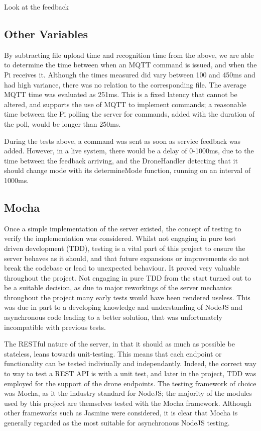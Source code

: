 \documentclass{article}
\begin{document}
Look at the feedback

\subsection{Other Variables}
By subtracting file upload time and recognition time from the above, we are able to determine the time between when an MQTT command is issued, and when the Pi receives it. Although the times measured did vary between 100 and 450ms and had high variance, there was no relation to the corresponding file. The average MQTT time was evaluated as 251ms. This is a fixed latency that cannot be altered, and supports the use of MQTT to implement commands; a reasonable time between the Pi polling the server for commands, added with the duration of the poll, would be longer than 250ms. 

During the tests above, a command was sent as soon as service feedback was added. However, in a live system, there would be a delay of 0-1000ms, due to the time between the feedback arriving, and the DroneHandler detecting that it should change mode with its determineMode function, running on an interval of 1000ms. 







\subsection{Mocha}
Once a simple implementation of the server existed, the concept of testing to verify the implementation was considered. Whilst not engaging in pure test driven development (TDD), testing is a vital part of this project to ensure the server behaves as it should, and that future expansions or improvements do not break the codebase or lead to unexpected behaviour. It proved very valuable throughout the project. Not engaging in pure TDD from the start turned out to be a suitable decision, as due to major reworkings of the server mechanics throughout the project many early tests would have been rendered useless. This was due in part to a developing knowledge and understanding of NodeJS and asynchronous code leading to a better solution, that was unfortunately incompatible with previous tests. 

The RESTful nature of the server, in that it should as much as possible be stateless, leans towards unit-testing. This means that each endpoint or functionality can be tested indiviually and independantly. Indeed, the correct way to way to test a REST API is with a unit test\cite{mardan2014tdd}, and later in the project, TDD was employed for the support of the drone endpoints. The testing framework of choice was Mocha, as it the industry standard for NodeJS; the majority of the modules used by this project are themselves tested with the Mocha framework. Although other frameworks such as Jasmine\cite{jasmine} were considered, it is clear that Mocha is generally regarded as the most suitable for asynchronous NodeJS testing\cite{testingReview}. 
\end{document}

